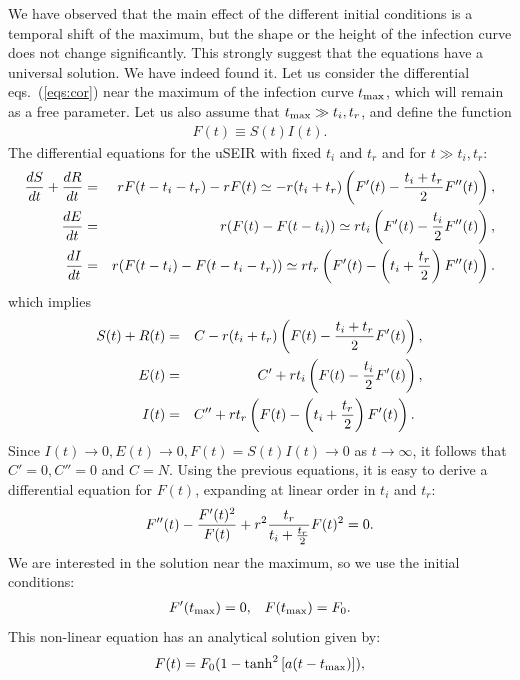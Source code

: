 \documentclass[10pt,letterpaper]{article}
\begin{document}
   We have observed  that the main effect of the different initial conditions is a temporal shift of the maximum, but the shape or the height of the infection curve does not change significantly. This strongly suggest that the equations have a universal solution. We have indeed found it. Let us  consider the differential eqs.~(\ref{eqs:cor}) near the maximum of the infection curve $t_{\rm max}$, which will remain as a free parameter. Let us also assume that $t_{\rm max} \gg t_i, t_r$, and define the function
 \begin{eqnarray}
 F(t) \equiv S(t) I(t).
 \end{eqnarray}
 The differential equations for the uSEIR with fixed $t_i$ and $t_r$ and for $t\gg t_i, t_r$:
 \begin{eqnarray}
 {d S \over dt}+{d R\over dt} &=& r F(t-t_i - t_r) - r F(t) \simeq -r (t_i+t_r) \left(F'(t)-{t_i+t_r\over 2} F''(t)\right), \nonumber\\
  {d E \over dt} &=& r (F(t) - F(t-t_i))  \simeq r t_i \left(F'(t)-{t_i\over 2} F''(t)\right) , \nonumber\\
   {d I \over dt} &=& r (F(t-t_i) - F(t-t_i-t_r))  \simeq r t_r \left(F'(t) - \left(t_i+{t_r\over 2}\right) F''(t)\right).
 \end{eqnarray}
 which implies
 \begin{eqnarray}
 S(t)+R(t) &=& C - r (t_i + t_r) \left(F(t)-{t_i+t_r\over 2} F'(t)\right), \nonumber\\
   E(t) &=& C' +r t_i \left( F(t)-{t_i\over 2} F'(t)\right), \nonumber\\
   I(t) &=& C'' +r t_r \left(F(t)-\left(t_i+{t_r\over 2}\right) F'(t)\right). \;\;
 \end{eqnarray}
 Since $I(t) \rightarrow 0, E(t)\rightarrow 0, F(t) = S(t) I(t) \rightarrow 0$ as $t\rightarrow \infty$, it follows that $C'=0, C''=0$ and $C= N$.
 Using the previous equations, it is easy to derive a differential equation for $F(t)$, expanding at linear order in $t_i$ and $t_r$:
  \begin{eqnarray}
 F''(t) - {F'(t)^2\over F(t)} + r^2 {t_r\over t_i+{t_r\over 2}} F(t)^2 = 0.
 \label{eq:diff}
 \end{eqnarray}
 We are interested in the solution near the maximum, so we use the initial conditions:
 \begin{eqnarray}
 F'(t_{\rm max}) = 0, \;\;\; F(t_{\rm max}) = F_0.
 \end{eqnarray}
 This non-linear equation has an analytical solution given by:
\begin{eqnarray}
F(t) = F_0 \large(1 - \tanh^2\left[ a (t-t_{\rm max})\right]\large),
\label{eq:tanh}
\end{eqnarray}
\end{document}
